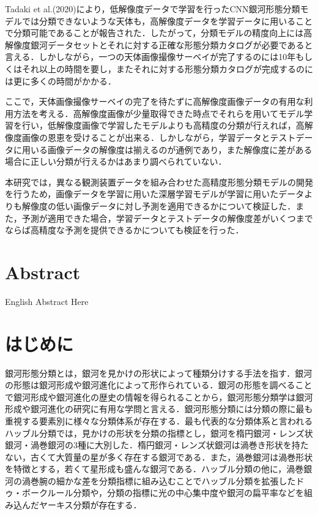 \documentclass[a4j, 11pt]{jreport}
\begin{document}
Tadaki et al.(2020)により，低解像度データで学習を行ったCNN銀河形態分類モデルでは分類できないような天体も，高解像度データを学習データに用いることで分類可能であることが報告された．したがって，分類モデルの精度向上には高解像度銀河データセットとそれに対する正確な形態分類カタログが必要であると言える．しかしながら，一つの天体画像撮像サーベイが完了するのには10年もしくはそれ以上の時間を要し，またそれに対する形態分類カタログが完成するのには更に多くの時間がかかる．

ここで，天体画像撮像サーベイの完了を待たずに高解像度画像データの有用な利用方法を考える．高解像度画像が少量取得できた時点でそれらを用いてモデル学習を行い，低解像度画像で学習したモデルよりも高精度の分類が行えれば，高解像度画像の恩恵を受けることが出来る．しかしながら，学習データとテストデータに用いる画像データの解像度は揃えるのが通例であり，また解像度に差がある場合に正しい分類が行えるかはあまり調べられていない．

本研究では，異なる観測装置データを組み合わせた高精度形態分類モデルの開発を行うため，画像データを学習に用いた深層学習モデルが学習に用いたデータよりも解像度の低い画像データに対し予測を適用できるかについて検証した．また，予測が適用できた場合，学習データとテストデータの解像度差がいくつまでならば高精度な予測を提供できるかについても検証を行った．

\chapter*{Abstract}
English Abstract Here


\newpage
\tableofcontents       %
\thispagestyle{empty}  %
\pagebreak
{} %


\chapter{はじめに}
銀河形態分類とは，銀河を見かけの形状によって種類分けする手法を指す．銀河の形態は銀河形成や銀河進化によって形作られている．銀河の形態を調べることで銀河形成や銀河進化の歴史の情報を得られることから，銀河形態分類学は銀河形成や銀河進化の研究に有用な学問と言える．銀河形態分類には分類の際に最も重視する要素別に様々な分類体系が存在する．最も代表的な分類体系と言われるハッブル分類では，見かけの形状を分類の指標とし，銀河を楕円銀河・レンズ状銀河・渦巻銀河の3種に大別した．楕円銀河・レンズ状銀河は渦巻き形状を持たない，古くて大質量の星が多く存在する銀河である．また，渦巻銀河は渦巻形状を特徴とする，若くて星形成も盛んな銀河である．ハッブル分類の他に，渦巻銀河の渦巻腕の細かな差を分類指標に組み込むことでハッブル分類を拡張したドゥ・ボークルール分類や，分類の指標に光の中心集中度や銀河の扁平率などを組み込んだヤーキス分類が存在する．
\end{document}
